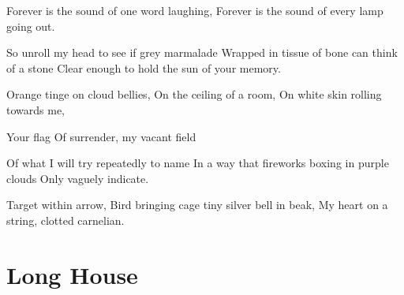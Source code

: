 \documentclass[english,11pt,letterpaper,onecolumn]{scrbook}
\begin{document}
\begin{poem}
\begin{stanza}
Forever is the sound of one word laughing,\verseline
Forever is the sound of every lamp going out.
\end{stanza}

\begin{stanza}
So unroll my head to see if grey marmalade\verseline
Wrapped in tissue of bone can think of a stone\verseline
Clear enough to hold the sun of your memory.
\end{stanza}

\begin{stanza}
Orange tinge on cloud bellies,\verseline
On the ceiling of a room,\verseline
On white skin rolling towards me,
\end{stanza}

\begin{stanza}
Your flag \verseline
Of surrender, my vacant field
\end{stanza}

\begin{stanza}
Of what I will try repeatedly to name\verseline
In a way that fireworks boxing in purple clouds\verseline
Only vaguely indicate.
\end{stanza}

\begin{stanza}
Target within arrow,\verseline
Bird bringing cage tiny silver bell in beak,\verseline
My heart on a string, clotted carnelian.
\end{stanza}
\end{poem}

\newpage
\section{Long House}
\end{document}
